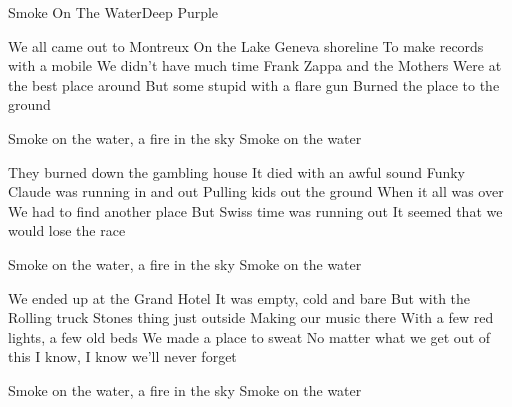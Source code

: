 \documentclass[a4paper,11pt,french]{article}
\begin{document}
\begin{Song}{Smoke On The Water}{Deep Purple}
\begin{multicols}{2}

\begin{Verse}
We all came out to Montreux
On the Lake Geneva shoreline
To make records with a mobile
We didn't have much time
Frank Zappa and the Mothers
Were at the best place around
But some stupid with a flare gun
Burned the place to the ground
\end{Verse}
\espaceInterStrophe

\begin{Chorus}
Smoke on the water, a fire in the sky
Smoke on the water
\end{Chorus}
\espaceInterStrophe

\begin{Verse}
They burned down the gambling house
It died with an awful sound
Funky Claude was running in and out
Pulling kids out the ground
When it all was over
We had to find another place
But Swiss time was running out
It seemed that we would lose the race
\end{Verse}
\espaceInterStrophe

\begin{Chorus}
Smoke on the water, a fire in the sky
Smoke on the water
\end{Chorus}
\columnbreak

\espaceInterStrophe

\begin{Verse}
We ended up at the Grand Hotel
It was empty, cold and bare
But with the Rolling truck Stones thing just outside
Making our music there
With a few red lights, a few old beds
We made a place to sweat
No matter what we get out of this
I know, I know we'll never forget
\end{Verse}
\espaceInterStrophe

\begin{Chorus}
Smoke on the water, a fire in the sky
Smoke on the water
\end{Chorus}
\espaceInterStrophe

\end{multicols}

\vfill

\begin{multicols}{2}

\gridGroupNormal

\begin{Chords}
\hline
\\\hline
\end{Chords}
\espaceInterGrille


\begin{Chords}
\hline
\\\hline
\end{Chords}

\end{multicols}

\vfill

\end{Song}
\end{document}
